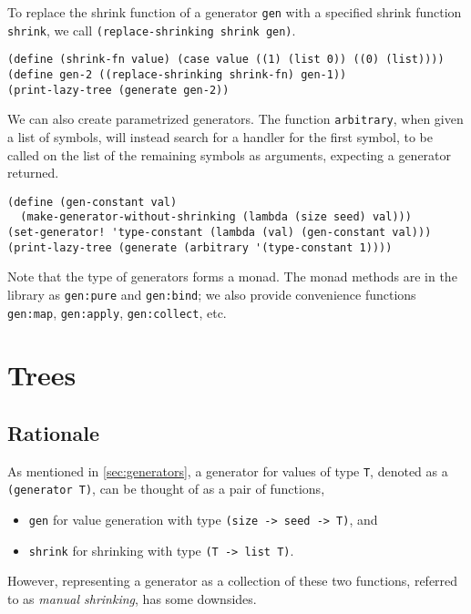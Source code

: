 \documentclass{scrartcl}
\begin{document}
To replace the shrink function of a generator \verb|gen| with a specified shrink
function \verb|shrink|, we call \verb|(replace-shrinking shrink gen)|.

\begin{verbatim}
(define (shrink-fn value) (case value ((1) (list 0)) ((0) (list))))
(define gen-2 ((replace-shrinking shrink-fn) gen-1))
(print-lazy-tree (generate gen-2))
\end{verbatim}

We can also create parametrized generators. The function \verb|arbitrary|, when
given a list of symbols, will instead search for a handler for the first symbol,
to be called on the list of the remaining symbols as arguments, expecting a
generator returned.

\begin{verbatim}
(define (gen-constant val)
  (make-generator-without-shrinking (lambda (size seed) val)))
(set-generator! 'type-constant (lambda (val) (gen-constant val)))
(print-lazy-tree (generate (arbitrary '(type-constant 1))))
\end{verbatim}

Note that the type of generators forms a monad. The monad methods are in the
library as \verb|gen:pure| and \verb|gen:bind|; we also provide convenience
functions \verb|gen:map|, \verb|gen:apply|, \verb|gen:collect|, etc.

\section{Trees}\label{sec:trees}
\subsection{Rationale}
As mentioned in \cref{sec:generators}, a generator for values of type \verb|T|,
denoted as a \verb|(generator T)|,
can be thought of as a pair of functions,
\begin{itemize}
  \item \verb|gen| for value generation
        with type \verb|(size -> seed -> T)|, and
  \item \verb|shrink| for shrinking with type \verb|(T -> list T)|.
\end{itemize}
However, representing a generator as a collection of these two functions,
referred to as \emph{manual shrinking}, has some downsides.
\end{document}
